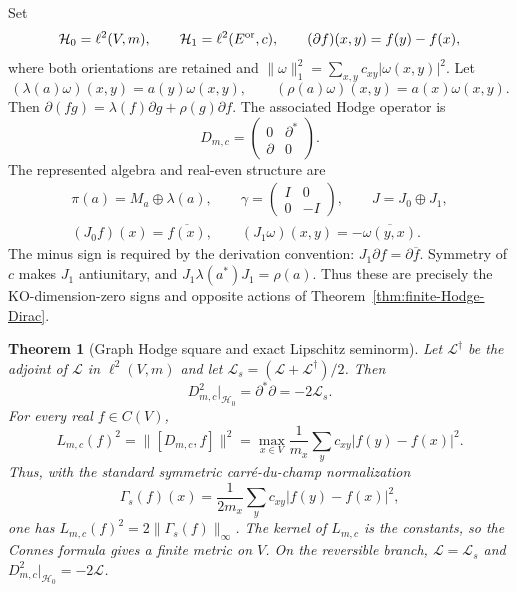 \documentclass[11pt]{article}
\newtheorem{theorem}{Theorem}[section]
\theoremstyle{definition}
\theoremstyle{remark}
\theoremstyle{definition}
\theoremstyle{remark}
\newcommand{\norm}[1]{\lVert#1\rVert}
\newcommand{\Hh}{\mathcal H}
\begin{document}
Set
\begin{equation}
 \Hh_0=\ell^2(V,m),
 \qquad
 \Hh_1=\ell^2(E^{\rm or},c),
 \qquad
 (\partial f)(x,y)=f(y)-f(x),
 \label{eq:supp-graph-carriers}
\end{equation}
where both orientations are retained and
$\norm{\omega}_1^2=\sum_{x,y}c_{xy}|\omega(x,y)|^2$.  Let
\begin{equation}
 (\lambda(a)\omega)(x,y)=a(y)\omega(x,y),
 \qquad
 (\rho(a)\omega)(x,y)=a(x)\omega(x,y).
 \label{eq:supp-graph-actions}
\end{equation}
Then $\partial(fg)=\lambda(f)\partial g+\rho(g)\partial f$.  The associated
Hodge operator is
\begin{equation}
 D_{m,c}=\begin{pmatrix}0&\partial^*\\\partial&0\end{pmatrix}.
 \label{eq:supp-graph-Dirac}
\end{equation}
The represented algebra and real-even structure are
\begin{equation}
 \begin{gathered}
 \pi(a)=M_a\oplus\lambda(a),\qquad
 \gamma=\begin{pmatrix}I&0\\0&-I\end{pmatrix},\qquad J=J_0\oplus J_1,\\
 (J_0f)(x)=\overline{f(x)},\qquad
 (J_1\omega)(x,y)=-\overline{\omega(y,x)}.
 \end{gathered}
 \label{eq:graph-real-even-structure}
\end{equation}
The minus sign is required by the derivation convention:
$J_1\partial f=\partial\overline f$.  Symmetry of $c$ makes $J_1$ antiunitary,
and $J_1\lambda(a^*)J_1=\rho(a)$.  Thus these are precisely the KO-dimension-zero
signs and opposite actions of Theorem~\ref{thm:finite-Hodge-Dirac}.

\begin{theorem}[Graph Hodge square and exact Lipschitz seminorm]
\label{thm:supp-graph-square}
Let $\mathcal L^\dagger$ be the adjoint of $\mathcal L$ in $\ell^2(V,m)$ and
let $\mathcal L_s=(\mathcal L+\mathcal L^\dagger)/2$.  Then
\begin{equation}
 {D_{m,c}^2|_{\Hh_0}=\partial^*\partial=-2\mathcal L_s.}
 \label{eq:supp-graph-square}
\end{equation}
For every real $f\in C(V)$,
\begin{equation}
 {
 L_{m,c}(f)^2
 =\norm{[D_{m,c},f]}^2
 =\max_{x\in V}\frac1{m_x}
   \sum_yc_{xy}|f(y)-f(x)|^2.}
 \label{eq:supp-graph-Lip}
\end{equation}
Thus, with the standard symmetric carr\'e-du-champ normalization
\begin{equation}
 \Gamma_s(f)(x)=\frac1{2m_x}\sum_yc_{xy}|f(y)-f(x)|^2,
 \label{eq:supp-carre-du-champ}
\end{equation}
one has $L_{m,c}(f)^2=2\|\Gamma_s(f)\|_\infty$.  The kernel of $L_{m,c}$ is the constants, so the Connes formula gives a finite
metric on $V$.  On the reversible branch, $\mathcal L=\mathcal L_s$ and
$D_{m,c}^2|_{\Hh_0}=-2\mathcal L$.
\end{theorem}
\end{document}
